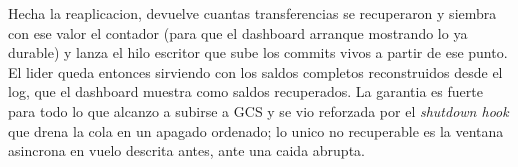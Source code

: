 Hecha la reaplicacion,  devuelve cuantas transferencias se
recuperaron y  siembra con ese valor el contador
 (para que el dashboard arranque mostrando lo ya durable) y lanza
el hilo escritor que sube los commits vivos a partir de ese punto. El lider queda
entonces sirviendo con los saldos completos reconstruidos desde el log, que el
dashboard muestra como saldos recuperados. La garantia es fuerte para todo lo que
alcanzo a subirse a GCS y se vio reforzada por el \emph{shutdown hook} que drena
la cola en un apagado ordenado; lo unico no recuperable es la ventana asincrona
en vuelo descrita antes, ante una caida abrupta.
